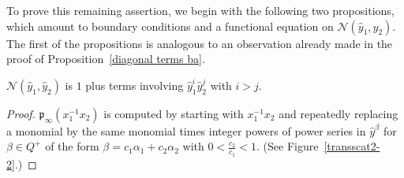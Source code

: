 \documentclass[ALCO,ThmDefs,Unicode,epreuves]{cedram}
\newcommand{\N}{{\mathcal N}}
\newcommand{\p}{{\mathfrak p}}
\newcommand{\hy}{\hat{y}}
\begin{document}
To prove this remaining assertion, we begin with the following two propositions, which amount to boundary conditions and a functional equation on $\N(\hy_1,\hy_2)$.
The first of the propositions is analogous to an observation already made in the proof of Proposition~\ref{diagonal terms ba}.
\begin{prop}\label{simple Nar fact}
$\N(\hy_1,\hy_2)$ is $1$ plus terms involving $\hy_1^i\hy_2^j$ with $i>j$.
\end{prop}
\begin{proof} 
$\p_\infty(x_1^{-1}x_2)$ is computed by starting with $x_1^{-1}x_2$ and repeatedly replacing a monomial by the same monomial times integer powers of power series in $\hy^\beta$ for $\beta\in Q^+$ of the form $\beta=c_1\alpha_1+c_2\alpha_2$ with $0<\frac{c_2}{c_1}<1$.
(See Figure~\ref{transscat2-2}.)
\end{proof}
\end{document}
